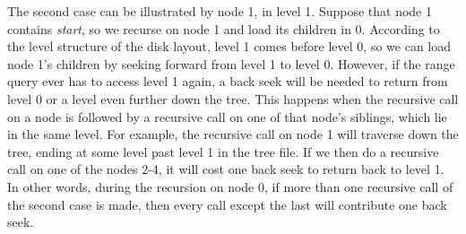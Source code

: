 \documentclass[11pt, oneside]{article}
\newcommand{\ms}{\textit}
\begin{document}
The second case can be illustrated by node 1, in level 1. Suppose that node 1
contains \ms{start}, so we recurse on node 1 and load its children in 0.
According to the level structure of the disk layout, level 1 comes before level
0, so we can load node 1's children by seeking forward from level 1 to level 0.
However, if the range query ever has to access level 1 again, a back seek will
be needed to return from level 0 or a level even further down the tree. This
happens when the recursive call on a node is followed by a recursive call on
one of that node's siblings, which lie in the same level. For example, the
recursive call on node 1 will traverse down the tree, ending at some level past
level 1 in the tree file. If we then do a recursive call on one of the nodes
2-4, it will cost one back seek to return back to level 1. In other words,
during the recursion on node 0, if more than one recursive call of the second
case is made, then every call except the last will contribute one back seek. \\
\end{document}
